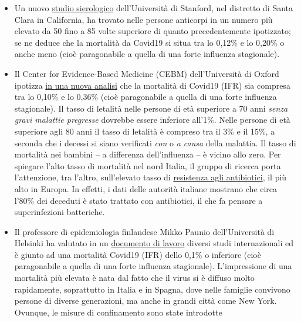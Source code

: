 \begin{itemize}
\tightlist
\item
  Un nuovo
  \href{https://www.medrxiv.org/content/10.1101/2020.04.14.20062463v1}{studio
  sierologico} dell'Università di Stanford, nel distretto di Santa Clara
  in California, ha trovato nelle persone anticorpi in un numero più
  elevato da 50 fino a 85 volte superiore di quanto precedentemente
  ipotizzato; se ne deduce che la mortalità da Covid19 si situa tra lo
  0,12\% e lo 0,20\% o anche meno (cioè paragonabile a quella di una
  forte influenza stagionale).
\item
  Il Center for Evidence-Based Medicine (CEBM) dell'Università di Oxford
  ipotizza
  \href{https://www.cebm.net/covid-19/global-covid-19-case-fatality-rates/}{in
  una nuova analisi} che la mortalità di Covid19 (IFR) sia compresa tra
  lo 0,10\% e lo 0,36\% (cioè paragonabile a quella di una forte
  influenza stagionale). Il tasso di letalità nelle persone di età
  superiore a 70 anni \emph{senza gravi malattie pregresse} dovrebbe
  essere inferiore all'1\%. Nelle persone di età superiore agli 80 anni
  il tasso di letalità è compreso tra il 3\% e il 15\%, a seconda che i
  decessi si siano verificati \emph{con} o \emph{a causa} della
  malattia. Il tasso di mortalità nei bambini -- a differenza
  dell'influenza -- è vicino allo zero. Per spiegare l'alto tasso di
  mortalità nel nord Italia, il gruppo di ricerca porta l'attenzione,
  tra l'altro, sull'elevato tasso di
  \href{https://www.ansa.it/english/news/science_tecnology/2019/11/19/italy-top-in-eu-in-antibiotic-resistance_369e0123-0107-445e-8c17-f11932c9d27c.html}{resistenza
  agli antibiotici}, il più alto in Europa. In effetti, i dati delle
  autorità italiane mostrano che circa l'80\% dei deceduti è stato
  trattato con antibiotici, il che fa pensare a superinfezioni
  batteriche.
\item
  Il professore di epidemiologia finlandese Mikko Paunio dell'Università
  di Helsinki ha valutato in un
  \href{https://lockdownsceptics.org/wp-content/uploads/2020/04/How-the-World-got-Fooled-by-COVID-ed-2c.pdf}{documento
  di lavoro} diversi studi internazionali ed è giunto ad una mortalità
  Covid19 (IFR) dello 0,1\% o inferiore (cioè paragonabile a quella di
  una forte influenza stagionale). L'impressione di una mortalità più
  elevata è nata dal fatto che il virus si è diffuso molto rapidamente,
  soprattutto in Italia e in Spagna, dove nelle famiglie convivono
  persone di diverse generazioni, ma anche in grandi città come New
  York. Ovunque, le misure di confinamento sono state introdotte

\end{itemize}
